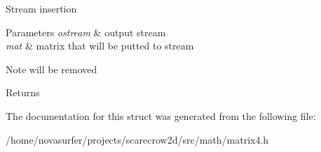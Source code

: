 Stream insertion 
\begin{DoxyParams}{Parameters}
{\em ostream} & output stream \\
\hline
{\em mat} & matrix that will be putted to stream \\
\hline
\end{DoxyParams}
\begin{DoxyNote}{Note}
will be removed 
\end{DoxyNote}
\begin{DoxyReturn}{Returns}

\end{DoxyReturn}


The documentation for this struct was generated from the following file\+:\begin{DoxyCompactItemize}
\item 
/home/novasurfer/projects/scarecrow2d/src/math/matrix4.\+h\end{DoxyCompactItemize}
